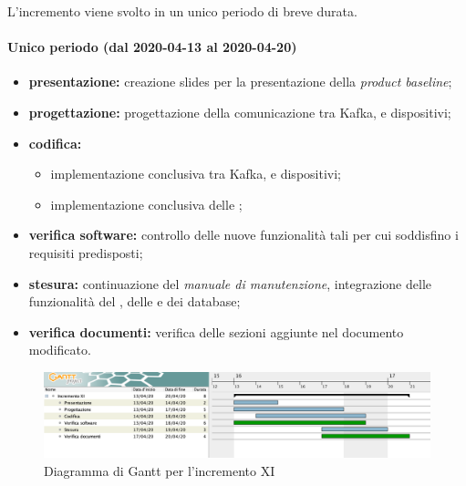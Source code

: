 				L'incremento viene svolto in un unico periodo di breve durata.
				
				\paragraph{Unico periodo (dal 2020-04-13 al 2020-04-20)}
				
					\begin{itemize}
						\item \textbf{presentazione:} creazione slides per la presentazione della \textit{product baseline};
						\item \textbf{progettazione:} progettazione della comunicazione tra Kafka,  e dispositivi;
						\item \textbf{codifica:} 
						\begin{itemize}
							\item implementazione conclusiva  tra Kafka,  e dispositivi; 
							\item implementazione conclusiva delle ;
						\end{itemize}
						\item \textbf{verifica software:} controllo delle nuove funzionalità tali per cui soddisfino i requisiti predisposti;
						\item \textbf{stesura:} continuazione del \textit{manuale di manutenzione}, integrazione delle funzionalità del , delle  e dei database;
						\item \textbf{verifica documenti:} verifica delle sezioni aggiunte nel documento modificato.
					\end{itemize} 			

		\begin{landscape}
          \begin{figure}[H]
            \centering
            \includegraphics[width=\linewidth]{images/gantt/incrementoXI} %
            \caption{Diagramma di Gantt per l'incremento XI}
          \end{figure}		
		\end{landscape}


